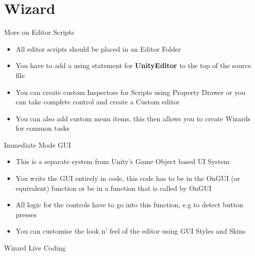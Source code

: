 \part{Wizard}
\frame{\partpage}

\begin{frame}{More on Editor Scripts}
	\begin{itemize}
		\item All editor scripts should be placed in an Editor Folder
		\item You have to add a using statement for \textbf{UnityEditor} to the top of the source file
		\item You can create custom Inspectors for Scripts using Property Drawer or you can take complete control and create a Custom editor
		\item You can also add custom menu items, this then allows you to create Wizards for common tasks
	\end{itemize}
\end{frame}

\begin{frame}{Immediate Mode GUI}
	\begin{itemize}
		\item This is a separate system from Unity's Game Object based UI System
		\item You write the GUI entirely in code, this code has to be in the OnGUI (or equivalent) function or be in a function that is called by OnGUI
		\item All logic for the controls have to go into this function, e.g to detect button presses
		\item You can customise the look n' feel of the editor using GUI Styles and Skins
	\end{itemize}
\end{frame}

\begin{frame}
	\begin{center}
		Wizard Live Coding
	\end{center}
\end{frame}